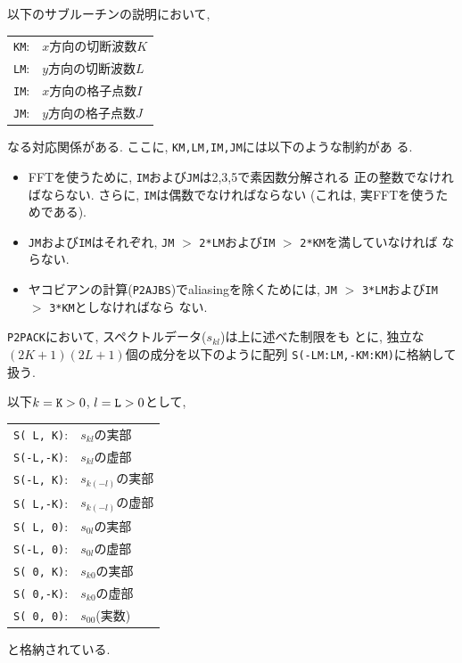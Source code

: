 \documentclass[a4j,fleqn]{jarticle}
\begin{document}
以下のサブルーチンの説明において,
\begin{center}
\begin{tabular}{rl}
{\tt KM}:& $x$方向の切断波数$K$\\
{\tt LM}:& $y$方向の切断波数$L$\\
{\tt IM}:& $x$方向の格子点数$I$\\
{\tt JM}:& $y$方向の格子点数$J$
\end{tabular}
\end{center}
なる対応関係がある. ここに, {\tt KM,LM,IM,JM}には以下のような制約があ
る.

\begin{itemize}
\item FFTを使うために, {\tt IM}および{\tt JM}は2,3,5で素因数分解される
正の整数でなければならない. さらに, {\tt IM}は偶数でなければならない
(これは, 実FFTを使うためである).

\item {\tt JM}および{\tt IM}はそれぞれ, 
{\tt JM} $>$ {\tt 2*LM}および{\tt IM} $>$ {\tt 2*KM}を満していなければ
ならない.

\item ヤコビアンの計算({\tt P2AJBS})でaliasingを除くためには, 
{\tt JM} $>$ {\tt 3*LM}および{\tt IM} $>$ {\tt 3*KM}としなければなら
ない.
\end{itemize}

{\tt P2PACK}において, スペクトルデータ($s_{kl}$)は上に述べた制限をも
とに, 独立な$(2K+1)(2L+1)$個の成分を以下のように配列
{\tt S(-LM:LM,-KM:KM)}に格納して扱う.

以下$k=\mbox{\tt K}>0$, $l=\mbox{\tt L}>0$として,
\begin{center}
\begin{tabular}{ll}
{\tt S( L, K)}:& $s_{kl}$の実部\\
{\tt S(-L,-K)}:& $s_{kl}$の虚部\\
{\tt S(-L, K)}:& $s_{k(-l)}$の実部\\
{\tt S( L,-K)}:& $s_{k(-l)}$の虚部\\
{\tt S( L, 0)}:& $s_{0l}$の実部\\
{\tt S(-L, 0)}:& $s_{0l}$の虚部\\
{\tt S( 0, K)}:& $s_{k0}$の実部\\
{\tt S( 0,-K)}:& $s_{k0}$の虚部\\
{\tt S( 0, 0)}:& $s_{00}$(実数)
\end{tabular}
\end{center}
と格納されている.

\end{document}
